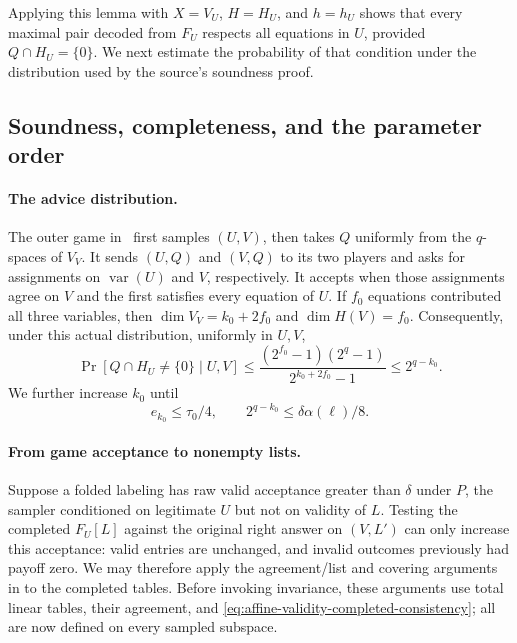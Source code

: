 Applying this lemma with $X=V_U$, $H=H_U$, and $h=h_U$ shows that
every maximal pair decoded from $F_U$ respects all equations in $U$,
provided $Q\cap H_U=\{0\}$.  We next estimate the probability of
that condition under the distribution used by the source's soundness
proof.

\subsection{Soundness, completeness, and the parameter order}

\paragraph{The advice distribution.}
The outer game in~\cite[Section~5.2]{DKKMS25} first samples $(U,V)$,
then takes $Q$ uniformly from the $q$-spaces of $V_V$.  It sends
$(U,Q)$ and $(V,Q)$ to its two players and asks for assignments on
$\operatorname{var}(U)$ and $V$, respectively.  It accepts when those
assignments agree on $V$ and the first satisfies every equation of $U$.
If $f_0$ equations contributed all three variables, then
$\dim V_V=k_0+2f_0$ and $\dim H(V)=f_0$.  Consequently, under this
actual distribution, uniformly in $U,V$,
\begin{equation}
 \Pr[Q\cap H_U\ne\{0\}\mid U,V]
 \le\frac{(2^{f_0}-1)(2^q-1)}{2^{k_0+2f_0}-1}
 \le2^{q-k_0}.
 \label{eq:affine-validity-advice-loss}
\end{equation}
We further increase $k_0$ until
\begin{equation}
 e_{k_0}\le\tau_0/4,
 \qquad 2^{q-k_0}\le\delta\alpha(\ell)/8.
 \label{eq:affine-validity-k-margins}
\end{equation}

\paragraph{From game acceptance to nonempty lists.}
Suppose a folded labeling has raw valid acceptance greater than
$\delta$ under $P$, the sampler conditioned on legitimate $U$ but not
on validity of $L$.  Testing the completed $F_U[L]$ against the
original right answer on $(V,L')$ can only increase this acceptance:
valid entries are unchanged, and invalid outcomes previously had payoff
zero.  We may therefore
apply the agreement/list and covering arguments in
\cite[Lemma~5.3, Claim~5.6, and Equation~(5.1)]{DKKMS25} to the
completed tables. Before invoking invariance, these arguments use total
linear tables, their agreement, and
\eqref{eq:affine-validity-completed-consistency}; all are now defined
on every sampled subspace.

